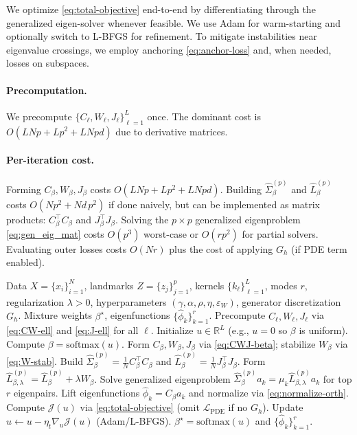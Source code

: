 \documentclass[11pt]{article}
\theoremstyle{remark}
\begin{document}
We optimize \eqref{eq:total-objective} end-to-end by differentiating through the generalized eigen-solver whenever feasible.
We use Adam for warm-starting and optionally switch to L-BFGS for refinement.
To mitigate instabilities near eigenvalue crossings, we employ anchoring \eqref{eq:anchor-loss} and, when needed, losses on subspaces.

\paragraph{Precomputation.}
We precompute $\{C_\ell,W_\ell,J_\ell\}_{\ell=1}^L$ once.
The dominant cost is $O(LNp + Lp^2 + L N p d)$ due to derivative matrices.

\paragraph{Per-iteration cost.}
Forming $C_\beta,W_\beta,J_\beta$ costs $O(LNp + Lp^2 + L N p d)$.
Building $\widehat{\Sigma}_\beta^{(p)}$ and $\widehat{L}_\beta^{(p)}$ costs $O(Np^2 + Nd\,p^2)$ if done naively, but can be implemented as matrix products:
$C_\beta^\top C_\beta$ and $J_\beta^\top J_\beta$.
Solving the $p\times p$ generalized eigenproblem \eqref{eq:gen_eig_mat} costs $O(p^3)$ worst-case or $O(rp^2)$ for partial solvers.
Evaluating outer losses costs $O(Nr)$ plus the cost of applying $G_h$ (if PDE term enabled).

\begin{algorithm}[t]
\caption{Variational Multiple Kernel Learning for Kernelized Diffusion Maps (VMKL--KDM)}
\label{alg:vmkl-kdm}
\begin{algorithmic}[1]
\Require Data $X=\{x_i\}_{i=1}^N$, landmarks $Z=\{z_j\}_{j=1}^p$, kernels $\{k_\ell\}_{\ell=1}^L$, modes $r$,
regularization $\lambda>0$, hyperparameters $(\gamma,\alpha,\rho,\eta,\varepsilon_W)$, generator discretization $G_h$.
\Ensure Mixture weights $\beta^\star$, eigenfunctions $\{\widehat{\phi}_k\}_{k=1}^r$.
\State Precompute $C_\ell,W_\ell,J_\ell$ via \eqref{eq:CW-ell} and \eqref{eq:J-ell} for all $\ell$.
\State Initialize $u\in\mathbb{R}^L$ (e.g., $u=0$ so $\beta$ is uniform).
  \State Compute $\beta=\mathrm{softmax}(u)$.
  \State Form $C_\beta,W_\beta,J_\beta$ via \eqref{eq:CWJ-beta}; stabilize $W_\beta$ via \eqref{eq:W-stab}.
  \State Build $\widehat{\Sigma}_\beta^{(p)}=\frac1N C_\beta^\top C_\beta$ and $\widehat{L}_\beta^{(p)}=\frac1N J_\beta^\top J_\beta$.
  \State Form $\widehat{L}_{\beta,\lambda}^{(p)}=\widehat{L}_\beta^{(p)}+\lambda W_\beta$.
  \State Solve generalized eigenproblem $\widehat{\Sigma}_\beta^{(p)} a_k=\mu_k \widehat{L}_{\beta,\lambda}^{(p)} a_k$ for top $r$ eigenpairs.
  \State Lift eigenfunctions $\widehat{\phi}_k = C_\beta a_k$ and normalize via \eqref{eq:normalize-orth}.
  \State Compute $\mathcal{J}(u)$ via \eqref{eq:total-objective} (omit $\mathcal{L}_{\mathrm{PDE}}$ if no $G_h$).
  \State Update $u \leftarrow u - \eta_t \nabla_u \mathcal{J}(u)$ (Adam/L-BFGS).
\EndFor
\State \Return $\beta^\star=\mathrm{softmax}(u)$ and $\{\widehat{\phi}_k\}_{k=1}^r$.
\end{algorithmic}
\end{algorithm}
\end{document}
